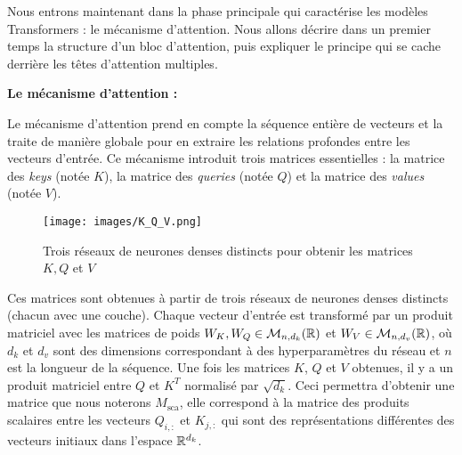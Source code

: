 \documentclass[12pt]{article}
\theoremstyle{definition}
\begin{document}
Nous entrons maintenant dans la phase principale qui caractérise les modèles Transformers : le mécanisme d'attention. Nous allons décrire dans un premier temps la structure d'un bloc d'attention, puis expliquer le principe qui se cache derrière les têtes d'attention multiples. 

\textbf{Le mécanisme d'attention :}

Le mécanisme d'attention prend en compte la séquence entière de vecteurs et la traite de manière globale pour en extraire les relations profondes entre les vecteurs d'entrée. Ce mécanisme introduit trois matrices essentielles : la matrice des \textit{keys} (notée \(K\)), la matrice des \textit{queries} (notée \(Q\)) et la matrice des \textit{values} (notée \(V\)).

\begin{figure*}[!h]
	\centering
	\texttt{[image: images/K\_Q\_V.png]}
	\caption{Trois réseaux de neurones denses distincts pour obtenir les matrices $K,Q$ et $V$ }
\end{figure*}


\newpage 
 Ces matrices sont obtenues à partir de trois réseaux de neurones denses distincts (chacun avec une couche). Chaque vecteur d'entrée est transformé par un produit matriciel avec les matrices de poids \(W_K, W_Q \in \mathcal{M}_{n,d_k}(\mathbb{R})\) et \(W_V \in \mathcal{M}_{n,d_v}(\mathbb{R})\), où \(d_k\) et \(d_v\) sont des dimensions correspondant à des hyperparamètres du réseau et \(n\) est la longueur de la séquence. Une fois les matrices \(K\), \(Q\) et \(V\)  obtenues, il y a un produit matriciel entre \(Q\) et \(K^T\) normalisé par \(\sqrt{d_k}\). Ceci permettra d'obtenir une matrice que nous noterons \(M_{\text{sca}}\), elle correspond à la matrice des produits scalaires entre les vecteurs \(Q_{i,:}\) et \(K_{j,:}\) qui sont des représentations différentes des vecteurs initiaux dans l'espace $\mathbb{R}^{d_k}$.
\end{document}
